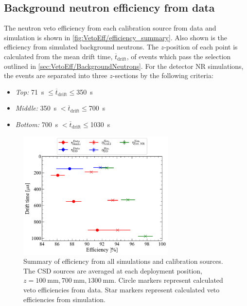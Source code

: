 \subsection{Background neutron efficiency from data}\label{sec:VetoEff/BkgNeutronEff}
The neutron veto efficiency from each calibration source from data and simulation is shown in \autoref{fig:VetoEff/efficiency_summary}. Also shown is the efficiency from simulated background neutrons.
The $z$-position of each point is calculated from the mean drift time, $\overline{t}_{\text{drift}}$, of events which pass the selection outlined in \autoref{sec:VetoEff/BackgroundNeutrons}.
For the detector NR simulations, the events are separated into three $z$-sections by the following criteria:
\begin{itemize}
    \item \textit{Top:} 71~\textmu s $\leq\overline{t}_{\text{drift}}\leq$350~\textmu s
    \item \textit{Middle:} 350~\textmu s $<\overline{t}_{\text{drift}}\leq$700~\textmu s
    \item \textit{Bottom:} 700~\textmu s $<\overline{t}_{\text{drift}}\leq$1030~\textmu s
\end{itemize}

\begin{figure}[!ht]
	\centering
	\includegraphics[width=0.7\textwidth]{figures/VetoEfficiency/SummaryPlot.pdf}
	\caption[Summary of efficiency from all simulations and calibration sources.]{Summary of efficiency from all simulations and calibration sources. The CSD sources are averaged at each deployment position, $z=100~\text{mm},700~\text{mm},1300~\text{mm}$. Circle markers represent calculated veto efficiencies from data. Star markers represent calculated veto efficiencies from simulation.}
	\label{fig:VetoEff/efficiency_summary}
\end{figure}

